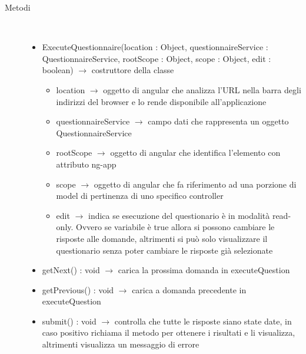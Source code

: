 \begin{description}
\item[Metodi] \hfill \\
\vspace{-7mm}
\begin{itemize}
	\item ExecuteQuestionnaire(location : Object, questionnaireService : QuestionnaireService, rootScope : Object, scope : Object, edit : boolean) $\rightarrow$ costruttore della classe\begin{itemize}
		\item location $\rightarrow$ oggetto di angular che analizza l'URL nella barra degli indirizzi del browser e lo rende disponibile all'applicazione
		\item questionnaireService $\rightarrow$ campo dati che rappresenta un oggetto QuestionnaireService
		\item rootScope $\rightarrow$ oggetto di angular che identifica l’elemento con attributo ng-app
		\item scope $\rightarrow$ oggetto di angular che fa riferimento ad una porzione di model di pertinenza di uno specifico controller
		\item edit $\rightarrow$ indica se esecuzione del questionario è in modalità read-only. Ovvero se variabile è true allora si possono cambiare le risposte alle domande, altrimenti si può solo visualizzare il questionario senza poter cambiare le risposte già selezionate 
	\end{itemize}
	
	\item getNext() : void $\rightarrow$ carica la prossima domanda in executeQuestion
	\item getPrevious() : void $\rightarrow$ carica a domanda precedente in executeQuestion
	\item submit() : void $\rightarrow$ controlla che tutte le risposte siano state date, in caso positivo richiama il metodo per ottenere i risultati e li visualizza, altrimenti visualizza un messaggio di errore
\end{itemize}

\end{description}

